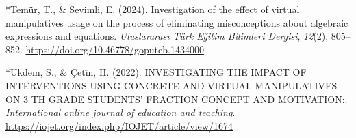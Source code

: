 \documentclass[man,a4paper,12pt,floatsintext,nolmodern,notab]{apa7}
\begin{document}
\par\noindent\hangindent=0.5in *Temür, T., \& Sevimli, E. (2024). Investigation of the effect of virtual manipulatives usage on the process of eliminating misconceptions about algebraic expressions and equations. \textit{Uluslararası Türk Eğitim Bilimleri Dergisi}, \textit{12}(2), 805–852. \url{https://doi.org/10.46778/goputeb.1434000}\par
\par\noindent\hangindent=0.5in *Ukdem, S., \& Çeti̇n, H. (2022). INVESTIGATING THE IMPACT OF INTERVENTIONS USING CONCRETE AND VIRTUAL MANIPULATIVES ON 3 TH GRADE STUDENTS' FRACTION CONCEPT AND MOTIVATION:. \textit{International online journal of education and teaching}. \url{https://iojet.org/index.php/IOJET/article/view/1674}\par
\end{document}
